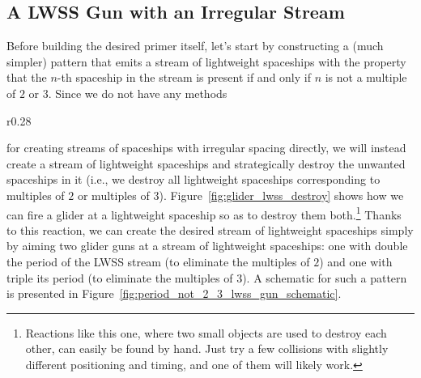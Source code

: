 \subsection{A LWSS Gun with an Irregular Stream}\label{sec:primer_irregular_stream}

Before building the desired primer itself, let's start by constructing a (much simpler) pattern that emits a stream of lightweight spaceships with the property that the $n$-th spaceship in the stream is present if and only if $n$ is not a multiple of $2$ or $3$. Since we do not have any methods
\begin{wrapfigure}{r}{0.28\textwidth}
	\centering
	\caption{A glider and an LWSS destroying each other.}\label{fig:glider_lwss_destroy}
\end{wrapfigure}
for creating streams of spaceships with irregular spacing directly, we will instead create a stream of lightweight spaceships and strategically destroy the unwanted spaceships in it (i.e., we destroy all lightweight spaceships corresponding to multiples of $2$ or multiples of $3$). Figure~\ref{fig:glider_lwss_destroy} shows how we can fire a glider at a lightweight spaceship so as to destroy them both.\footnote{Reactions like this one, where two small objects are used to destroy each other, can easily be found by hand. Just try a few collisions with slightly different positioning and timing, and one of them will likely work.} Thanks to this reaction, we can create the desired stream of lightweight spaceships simply by aiming two glider guns at a stream of lightweight spaceships: one with double the period of the LWSS stream (to eliminate the multiples of $2$) and one with triple its period (to eliminate the multiples of $3$). A schematic for such a pattern is presented in Figure~\ref{fig:period_not_2_3_lwss_gun_schematic}. 

